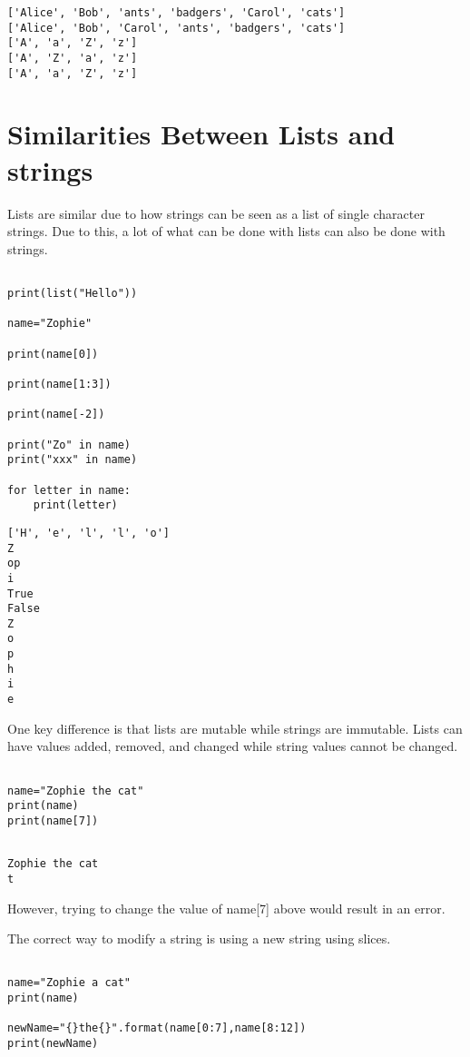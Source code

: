 \documentclass[11pt]{article}
\begin{document}
\begin{verbatim}
['Alice', 'Bob', 'ants', 'badgers', 'Carol', 'cats']
['Alice', 'Bob', 'Carol', 'ants', 'badgers', 'cats']
['A', 'a', 'Z', 'z']
['A', 'Z', 'a', 'z']
['A', 'a', 'Z', 'z']
\end{verbatim}

\section{Similarities Between Lists and strings}
\label{sec:orgfd7c712}

Lists are similar due to how strings can be seen as a list of single character strings. Due to this, a lot of what can be done with lists can also be done with strings.


\begin{verbatim}

print(list("Hello"))

name="Zophie"

print(name[0])

print(name[1:3])

print(name[-2])

print("Zo" in name)
print("xxx" in name)

for letter in name:
    print(letter)

\end{verbatim}

\begin{verbatim}
['H', 'e', 'l', 'l', 'o']
Z
op
i
True
False
Z
o
p
h
i
e
\end{verbatim}

One key difference is that lists are mutable while strings are immutable. Lists can have values added, removed, and changed while string values cannot be changed.


\begin{verbatim}

name="Zophie the cat"
print(name)
print(name[7])


\end{verbatim}

\begin{verbatim}
Zophie the cat
t
\end{verbatim}


However, trying to change the value of name[7] above would result in an error.

The correct way to modify a string is using a new string using slices.


\begin{verbatim}

name="Zophie a cat"
print(name)

newName="{}the{}".format(name[0:7],name[8:12])
print(newName)
\end{verbatim}
\end{document}
